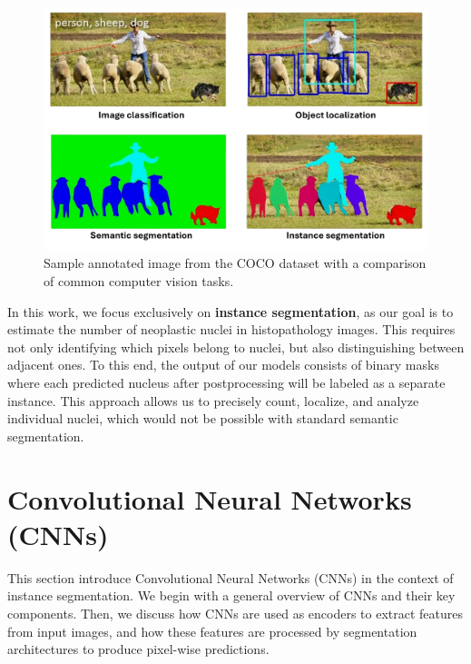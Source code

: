 \documentclass[target=bach,aauheader=,style=]{thud}
\begin{document}
\begin{figure}[h]
    \centering
    \includegraphics[width=0.75\linewidth]{imgs/Instance segmentation.png}
    \caption{Sample annotated image from the COCO \cite{lin2015microsoftcococommonobjects} dataset with a comparison of common computer vision tasks.}
    \label{fig:semantic}
\end{figure}

In this work, we focus exclusively on \textbf{instance segmentation}, as our goal is to estimate the number of neoplastic nuclei in histopathology images. This requires not only identifying which pixels belong to nuclei, but also distinguishing between adjacent ones. To this end, the output of our models consists of binary masks where each predicted nucleus after postprocessing will be labeled as a separate instance. This approach allows us to precisely count, localize, and analyze individual nuclei, which would not be possible with standard semantic segmentation.
\section{Convolutional Neural Networks (CNNs)}
This section introduce Convolutional Neural Networks (CNNs) in the context of instance segmentation. We begin with a general overview of CNNs and their key components. Then, we discuss how CNNs are used as encoders to extract features from input images, and how these features are processed by segmentation architectures to produce pixel-wise predictions.
\end{document}

